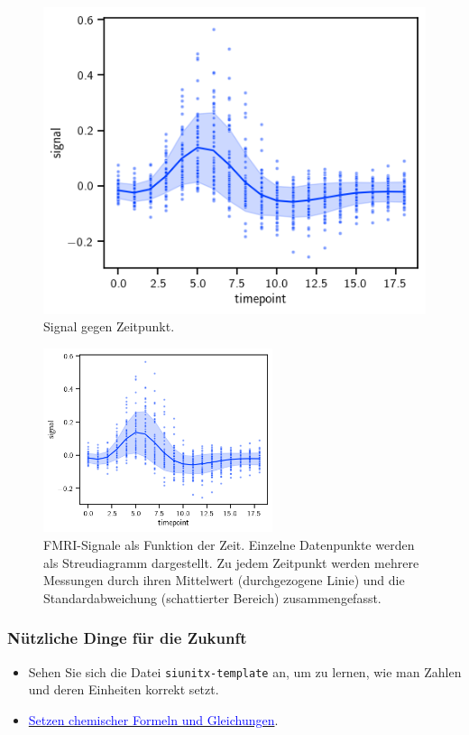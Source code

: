 \documentclass[
	german,
	accentcolor=9c,%
	type=intern,
	marginpar=false
	]{tudapub}
\begin{document}
\begin{figure}[htbp]
\centering
\includegraphics[width=\textwidth]{output.png}
\caption{Signal gegen Zeitpunkt.}
\label{fig:bad}
\end{figure}

\begin{figure}[h]
\centering
\includegraphics[width=0.6\textwidth]{output.png}
\caption{FMRI-Signale als Funktion der Zeit. Einzelne Datenpunkte werden als Streudiagramm dargestellt. Zu jedem Zeitpunkt werden mehrere Messungen durch ihren Mittelwert (durchgezogene Linie) und die Standardabweichung (schattierter Bereich) zusammengefasst.}
\label{fig:good}
\end{figure}


\subsubsection{Nützliche Dinge für die Zukunft}  %
\begin{itemize}
\item Sehen Sie sich die Datei \texttt{siunitx-template} an, um zu lernen, wie man Zahlen und deren Einheiten korrekt setzt.
\item \href{https://www.overleaf.com/learn/latex/Chemistry_formulae#Using_mhchem_to_typeset_chemical_formulae_and_equations}{\textcolor{blue}{Setzen chemischer Formeln und Gleichungen}}.
\end{itemize}
\end{document}
